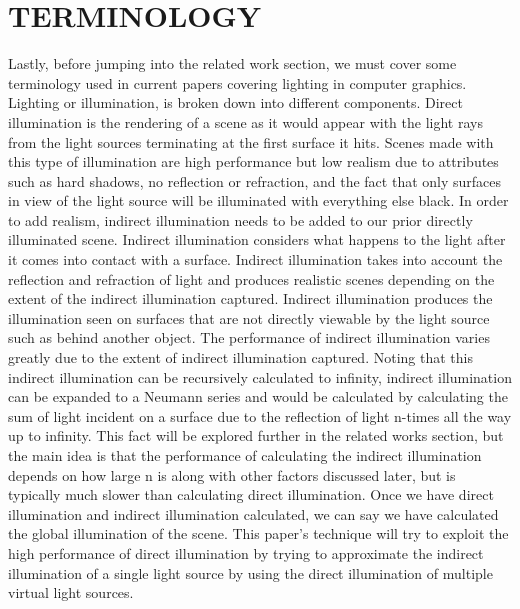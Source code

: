 \section{TERMINOLOGY}
Lastly, before jumping into the related work section, we must cover some terminology used in current papers covering lighting in computer graphics.  Lighting or illumination, is broken down into different components.  Direct illumination is the rendering of a scene as it would appear with the light rays from the light sources terminating at the first surface it hits.  Scenes made with this type of illumination are high performance but low realism due to attributes such as hard shadows, no reflection or refraction, and the fact that only surfaces in view of the light source will be illuminated with everything else black.  In order to add realism, indirect illumination needs to be added to our prior directly illuminated scene.  Indirect illumination considers what happens to the light after it comes into contact with a surface.  Indirect illumination takes into account the reflection and refraction of light and produces realistic scenes depending on the extent of the indirect illumination captured.  Indirect illumination produces the illumination seen on surfaces that are not directly viewable by the light source such as behind another object.  The performance of indirect illumination varies greatly due to the extent of indirect illumination captured.  Noting that this indirect illumination can be recursively calculated to infinity, indirect illumination can be expanded to a Neumann series and would be calculated by calculating the sum of light incident on a surface due to the reflection of light n-times all the way up to infinity.  This fact will be explored further in the related works section, but the main idea is that the performance of calculating the indirect illumination depends on how large n is along with other factors discussed later, but is typically much slower than calculating direct illumination.  Once we have direct illumination and indirect illumination calculated, we can say we have calculated the global illumination of the scene.  This paper's technique will try to exploit the high performance of direct illumination by trying to approximate the indirect illumination of a single light source by using the direct illumination of multiple virtual light sources.
